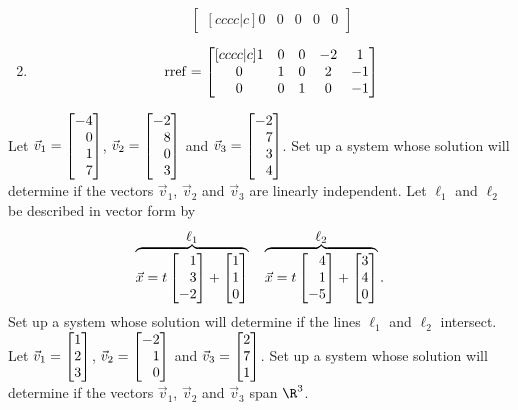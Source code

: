 \begin{exercises}
\begin{problist}
\begin{solution}
\begin{enumerate}
\[\begin{bmatrix}[cccc|c]
					0 & 0 & 0 & 0 & 0
					\end{bmatrix}
				\]
				\item 
				\[
					\operatorname{rref}=
					\begin{bmatrix}[cccc|c]
					1 & 0 & 0 & -2 & 1\\
					0 & 1 & 0 & 2 & -1\\
					0 & 0 & 1 & 0 & -1
					\end{bmatrix}
				\]
			\end{enumerate}
		\end{solution}
		\prob Let $\vec v_1=\mat{-4\\0\\1\\7}$, $\vec v_2=\mat{-2\\8\\0\\3}$ and $\vec v_3=\mat{-2\\7\\3\\4}$. Set up a system whose solution will determine if the vectors $\vec v_1$, $\vec v_2$ and $\vec v_3$ are linearly independent.
		\prob Let $\ell_1$ and $\ell_2$ be described in vector form by
		\[
			\overbrace{\vec x=t\mat{1\\3\\-2}+\mat{1\\1\\0}}^{\displaystyle \ell_1}
			\quad
			\overbrace{\vec x=t\mat{4\\1\\-5}+\mat{3\\4\\0}}^{\displaystyle \ell_2}.
		\]
		Set up a system whose solution will determine if the lines $\ell_1$ and $\ell_2$ intersect.
		\prob Let $\vec v_1=\mat{1\\2\\3}$, $\vec v_2=\mat{-2\\1\\0}$ and $\vec v_3=\mat{2\\7\\1}$. Set up a system whose solution will determine if the vectors $\vec v_1$, $\vec v_2$ and $\vec v_3$ span $\R^3$.
	\end{problist}
\end{exercises}

